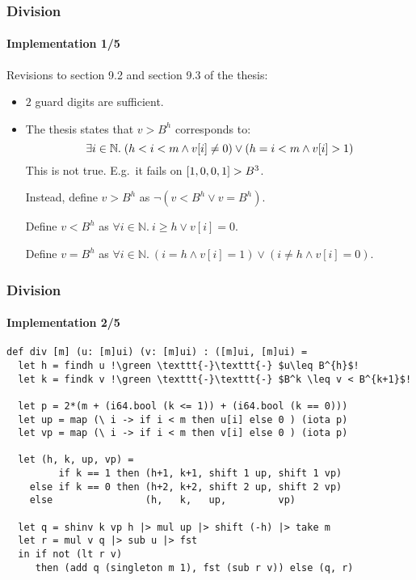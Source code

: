\begin{frame}[fragile]
  \frametitle{Division}
  \framesubtitle{Implementation 1/5}
  Revisions to section 9.2 and section 9.3 of the thesis:
  \begin{itemize}
  \item $2$ guard digits are sufficient.\pause
  \item The thesis states that $v > B^h$ corresponds to:
    \begin{equation}\footnotesize
    \exists i\in \mathbb{N}.~(h<i<m \land v[i] \neq 0) \lor (h = i<m \land v[i] > 1)
  \end{equation}
  This is not true. E.g.\ it fails on $\mathtt{[}1,0,0,1\mathtt{]} > B^3$.\pause

  Instead, define $v > B^h$ as {\footnotesize $\neg(v < B^h \lor v = B^h)$}.

  Define $v < B^h$ as {\footnotesize $\forall i\in \mathbb{N}.~i \geq h \lor v[i] = 0$}.

  Define $v = B^h$ as {\footnotesize $\forall i\in \mathbb{N}.~(i=h \land v[i] = 1) \lor (i \neq h \land v[i] = 0)$}.
    \end{itemize}
  \end{frame}

\begin{frame}[fragile]
  \frametitle{Division}
  \framesubtitle{Implementation 2/5}
\begin{lstlisting}[language=futhark,basicstyle=\scriptsize,escapeinside=!!,frame=single]
def div [m] (u: [m]ui) (v: [m]ui) : ([m]ui, [m]ui) =
  let h = findh u !\green \texttt{-}\texttt{-} $u\leq B^{h}$!
  let k = findk v !\green \texttt{-}\texttt{-} $B^k \leq v < B^{k+1}$!

  let p = 2*(m + (i64.bool (k <= 1)) + (i64.bool (k == 0)))
  let up = map (\ i -> if i < m then u[i] else 0 ) (iota p)
  let vp = map (\ i -> if i < m then v[i] else 0 ) (iota p)

  let (h, k, up, vp) =
         if k == 1 then (h+1, k+1, shift 1 up, shift 1 vp)
    else if k == 0 then (h+2, k+2, shift 2 up, shift 2 vp)
    else                (h,   k,   up,         vp)

  let q = shinv k vp h |> mul up |> shift (-h) |> take m
  let r = mul v q |> sub u |> fst
  in if not (lt r v)
     then (add q (singleton m 1), fst (sub r v)) else (q, r)
\end{lstlisting}
\end{frame}


